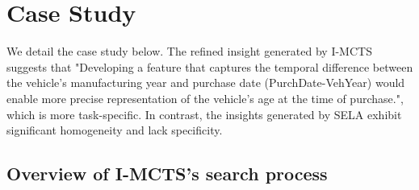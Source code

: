 \newpage
\section{Case Study}
\label{app:case}
We detail the case study below. The refined insight generated by I-MCTS suggests that "Developing a feature that captures the temporal difference between the vehicle's manufacturing year and purchase date (PurchDate-VehYear) would enable more precise representation of the vehicle's age at the time of purchase.", which is more task-specific.
In contrast, the insights generated by SELA exhibit significant homogeneity and lack specificity. 
\subsection{Overview of I-MCTS's search process}

